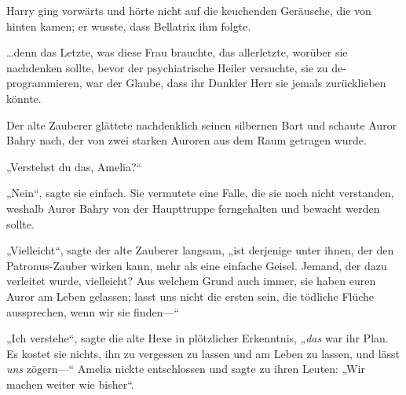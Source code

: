 Harry ging vorwärts und hörte nicht auf die keuchenden Geräusche, die von hinten kamen; er wusste, dass Bellatrix ihm folgte.

…denn das Letzte, was diese Frau brauchte, das allerletzte, worüber sie nachdenken sollte, bevor der psychiatrische Heiler versuchte, sie zu de-programmieren, war der Glaube, dass ihr Dunkler Herr sie jemals zurücklieben könnte.

\later

Der alte Zauberer glättete nachdenklich seinen silbernen Bart und schaute Auror Bahry nach, der von zwei starken Auroren aus dem Raum getragen wurde.

„Verstehst du das, Amelia?“

„Nein“, sagte sie einfach. Sie vermutete eine Falle, die sie noch nicht verstanden, weshalb Auror Bahry von der Haupttruppe ferngehalten und bewacht werden sollte.

„Vielleicht“, sagte der alte Zauberer langsam, „ist derjenige unter ihnen, der den Patronus-Zauber wirken kann, mehr als eine einfache Geisel. Jemand, der dazu verleitet wurde, vielleicht? Aus welchem Grund auch immer, sie haben euren Auror am Leben gelassen; lasst uns nicht die ersten sein, die tödliche Flüche aussprechen, wenn wir sie finden—“

„Ich verstehe“, sagte die alte Hexe in plötzlicher Erkenntnis, „\emph{das} war ihr Plan. Es kostet sie nichts, ihn zu vergessen zu lassen und am Leben zu lassen, und lässt \emph{uns} zögern—“ Amelia nickte entschlossen und sagte zu ihren Leuten:
„Wir machen weiter wie bisher“.

